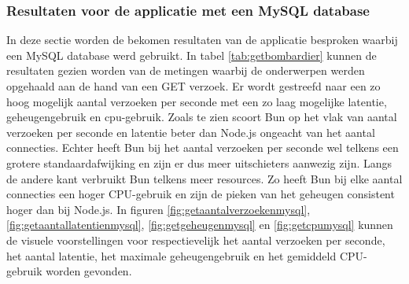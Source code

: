 \subsubsection{Resultaten voor de applicatie met een MySQL database}
In deze sectie worden de bekomen resultaten van de applicatie besproken waarbij een MySQL database werd gebruikt.
In tabel \ref{tab:getbombardier} kunnen de resultaten gezien worden van de metingen waarbij de onderwerpen werden opgehaald aan de hand van een GET verzoek.
Er wordt gestreefd naar een zo hoog mogelijk aantal verzoeken per seconde met een zo laag mogelijke latentie, geheugengebruik en cpu-gebruik.
Zoals te zien scoort Bun op het vlak van aantal verzoeken per seconde en latentie beter dan Node.js ongeacht van het aantal connecties. 
Echter heeft Bun bij het aantal verzoeken per seconde wel telkens een grotere standaardafwijking en zijn er dus meer uitschieters aanwezig zijn.
Langs de andere kant verbruikt Bun telkens meer resources. Zo heeft Bun bij elke aantal connecties een hoger CPU-gebruik en zijn de pieken van het geheugen consistent hoger dan bij Node.js.
In figuren \ref{fig:getaantalverzoekenmysql}, \ref{fig:getaantallatentienmysql}, \ref{fig:getgeheugenmysql} en \ref{fig:getcpumysql} kunnen de visuele voorstellingen 
voor respectievelijk het aantal verzoeken per seconde, het aantal latentie, het maximale geheugengebruik en het gemiddeld CPU-gebruik worden gevonden.
